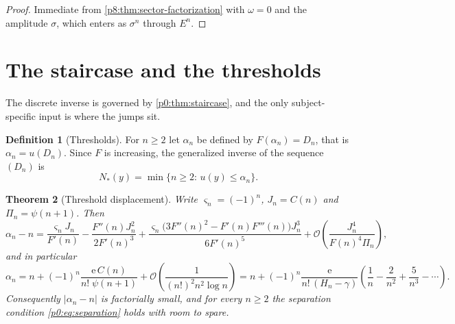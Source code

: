 \documentclass[11pt,a4paper,oneside]{book}
\theoremstyle{plain}
\newtheorem{theorem}{Theorem}[chapter]
\theoremstyle{definition}
\newtheorem{definition}[theorem]{Definition}
\theoremstyle{remark}
\newcommand{\e}{\mathrm{e}}
\newcommand{\bigO}{\mathcal{O}}
\begin{document}
\begin{proof}
Immediate from \cref{p8:thm:sector-factorization} with $\omega=0$ and the
amplitude $\sigma$, which enters as $\sigma^{n}$ through $E^{n}$.
\end{proof}

\section{The staircase and the thresholds}
\label{p8:sec:staircase}

The discrete inverse is governed by \cref{p0:thm:staircase}, and the only
subject-specific input is where the jumps sit.

\begin{definition}[Thresholds]\label{p8:def:thresholds}
For $n\ge2$ let $\alpha_n$ be defined by $F(\alpha_n)=D_n$, that is
$\alpha_n=u(D_n)$.  Since $F$ is increasing, the generalized inverse of the
sequence $(D_n)$ is
\begin{equation}\label{p8:eq:N-threshold}
 N_\ast(y)=\min\{n\ge2:\,u(y)\le\alpha_n\} .
\end{equation}
\end{definition}

\begin{theorem}[Threshold displacement]\label{p8:thm:thresholds}
Write $\varsigma_n=(-1)^{n}$, $J_n=C(n)$ and $\Pi_n=\psi(n+1)$.  Then
\begin{equation}\label{p8:eq:threshold-taylor}
 \alpha_n-n
 =\frac{\varsigma_nJ_n}{F'(n)}
 -\frac{F''(n)J_n^{2}}{2F'(n)^{3}}
 +\frac{\varsigma_n\bigl(3F''(n)^{2}-F'(n)F'''(n)\bigr)J_n^{3}}
 {6F'(n)^{5}}
 +\bigO\!\left(\frac{J_n^{4}}{F(n)^{4}\Pi_n}\right),
\end{equation}
and in particular
\begin{equation}\label{p8:eq:threshold-leading}
 \alpha_n=n+(-1)^{n}\frac{\e\,C(n)}{n!\;\psi(n+1)}
 +\bigO\!\left(\frac1{(n!)^{2}n^{2}\log n}\right)
 =n+(-1)^{n}\frac{\e}{n!\,(H_n-\gamma)}
 \left(\frac1n-\frac2{n^{2}}+\frac5{n^{3}}-\cdots\right).
\end{equation}
Consequently $|\alpha_n-n|$ is factorially small, and for every $n\ge2$ the
separation condition \eqref{p0:eq:separation} holds with room to spare.
\end{theorem}
\end{document}
